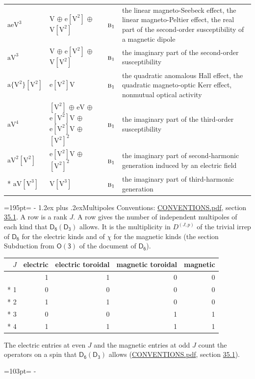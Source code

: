 \documentclass[10pt,a4paper]{article}
\makeatletter
\renewcommand\section{\@startsection{section}{1}{\z@}{-3ex plus -1ex minus -.2ex}%
  {1.2ex plus .2ex}{\normalfont\large\sffamily\bfseries\color{parttitle}}}
\newcommand{\needspace}[1]{\par\penalty-100\begingroup\dimen0=#1\relax\dimen2=\pagegoal
  \advance\dimen2-\pagetotal\ifdim\dimen0>\dimen2\relax\ifdim\dimen2>0pt\vfil\break\fi\fi
  \endgroup}
\numberwithin{equation}{section}
\newcommand{\grp}[1]{\mathsf{#1}}
\newcommand{\irr}[1]{\text{\normalfont\scshape #1}}
\newcommand{\irrJp}[2]{D^{(#1,#2)}}
\newcommand{\jahn}[1]{\mathrm{#1}}
\newlength{\fillwidth}\newlength{\cellwidth}\newlength{\colwidth}
\makeatother
\begin{document}
{\begin{longtable}{@{}lll>{\RaggedRight\arraybackslash}p{\fillwidth}@{}}
$\jahn{aeV^{3}}$ & $\jahn{V}$ $\oplus$ $\jahn{e[V^{2}]}$ $\oplus$ $\jahn{V[V^{2}]}$ & $\irr{b}_{1}$ & the linear magneto-Seebeck effect, the linear magneto-Peltier effect, the real part of the second-order susceptibility of a magnetic dipole\\
$\jahn{aV^{3}}$ & $\jahn{V}$ $\oplus$ $\jahn{e[V^{2}]}$ $\oplus$ $\jahn{V[V^{2}]}$ & $\irr{b}_{1}$ & the imaginary part of the second-order susceptibility\\
$\jahn{a\{V^{2}\}[V^{2}]}$ & $\jahn{e[V^{2}]V}$ & $\irr{b}_{1}$ & the quadratic anomalous Hall effect, the quadratic magneto-optic Kerr effect, nonmutual optical activity\\
$\jahn{aV^{4}}$ & $\jahn{[V^{2}]}$ $\oplus$ $\jahn{eV}$ $\oplus$ $\jahn{e[V^{2}]V}$ $\oplus$ $\jahn{e[V^{2}]V}$ $\oplus$ $\jahn{[V^{2}]^{2}}$ & $\irr{b}_{1}$ & the imaginary part of the third-order susceptibility\\
$\jahn{aV^{2}[V^{2}]}$ & $\jahn{e[V^{2}]V}$ $\oplus$ $\jahn{[V^{2}]^{2}}$ & $\irr{b}_{1}$ & the imaginary part of second-harmonic generation induced by an electric field\\*
$\jahn{aV[V^{3}]}$ & $\jahn{V[V^{3}]}$ & $\irr{b}_{1}$ & the imaginary part of third-harmonic generation\\
\bottomrule\end{longtable}}
\needspace{195pt}
\section{Multipoles}\label{s:multipoles}
Conventions: \href{../../CONVENTIONS.pdf}{CONVENTIONS.pdf}, section \href{../../CONVENTIONS.pdf\#conv.35.1}{35.1}.
A row is a rank $J$. \label{n:head.multipole.electric}\label{n:head.multipole.electric.toroidal}\label{n:head.multipole.magnetic.toroidal}\label{n:head.multipole.magnetic}A row gives the number of independent multipoles of each kind that $\grp{D_{6}}(\grp{D_{3}})$ allows. It is the multiplicity in $\irrJp{J}{p}$ of the trivial irrep of $\grp{D_{6}}$ for the electric kinds and of $\chi$ for the magnetic kinds (the section Subduction from $\grp{O(3)}$ of the document of \href{../../../rotation/data/pdf/D6.pdf}{$\grp{D_{6}}$}).
{\small\begin{longtable}{@{}rrrrr@{}}\toprule
$J$ & electric & electric toroidal & magnetic toroidal & magnetic\\\midrule\endhead
\bottomrule\endfoot\endlastfoot
0 & 1 & 1 & 0 & 0\\*
1 & 0 & 0 & 0 & 0\\*
2 & 1 & 1 & 0 & 0\\*
3 & 0 & 0 & 1 & 1\\*
4 & 1 & 1 & 1 & 1\\
\bottomrule\end{longtable}}
The electric entries at even $J$ and the magnetic entries at odd $J$ count the operators on a spin that $\grp{D_{6}}(\grp{D_{3}})$ allows (\href{../../CONVENTIONS.pdf}{CONVENTIONS.pdf}, section \href{../../CONVENTIONS.pdf\#conv.35.1}{35.1}).
\needspace{103pt}
\end{document}
